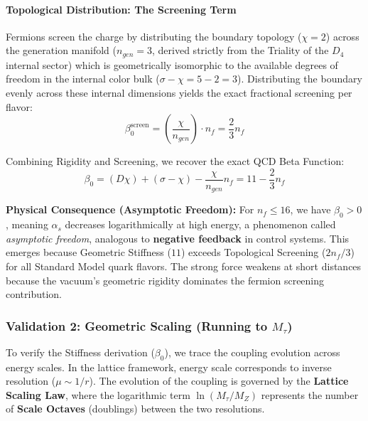 \paragraph{Topological Distribution: The Screening Term}
Fermions screen the charge by distributing the boundary topology ($\chi=2$) across the generation manifold ($n_{gen}=3$, derived strictly from the Triality of the $D_4$ internal sector) which is geometrically isomorphic to the available degrees of freedom in the internal color bulk ($\sigma - \chi = 5 - 2 = 3$). Distributing the boundary evenly across these internal dimensions yields the exact fractional screening per flavor:
\begin{equation}
    \beta_0^{\text{screen}} = \left( \frac{\chi}{n_{gen}} \right) \cdot n_f = \frac{2}{3} n_f
\end{equation}

Combining Rigidity and Screening, we recover the exact QCD Beta Function:
\begin{equation} \label{eq:beta_qcd}
    \beta_0 = (D\chi) + (\sigma-\chi) - \frac{\chi}{n_{gen}} n_f = 11 - \frac{2}{3}n_f
\end{equation}

\textbf{Physical Consequence (Asymptotic Freedom):} For $n_f \leq 16$, we have $\beta_0 > 0$, meaning $\alpha_s$ decreases logarithmically at high energy, a phenomenon called \textit{asymptotic freedom}, analogous to \textbf{negative feedback} in control systems. This emerges because Geometric Stiffness ($11$) exceeds Topological Screening ($2n_f/3$) for all Standard Model quark flavors. The strong force weakens at short distances because the vacuum's geometric rigidity dominates the fermion screening contribution.



\subsubsection{Validation 2: Geometric Scaling (Running to \texorpdfstring{$M_\tau$}{Mtau})}

To verify the Stiffness derivation ($\beta_0$), we trace the coupling evolution across energy scales. In the lattice framework, energy scale corresponds to inverse resolution ($\mu \sim 1/r$). The evolution of the coupling is governed by the \textbf{Lattice Scaling Law}, where the logarithmic term $\ln(M_\tau/M_Z)$ represents the number of \textbf{Scale Octaves} (doublings) between the two resolutions.

